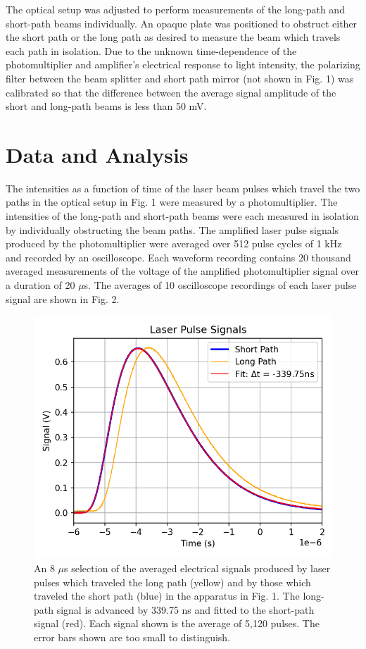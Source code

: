\documentclass[%
 reprint,
 amsmath,amssymb,
 aps,
]{revtex4-2}
\begin{document}
The optical setup was adjusted to perform measurements of the long-path and short-path beams individually. An opaque plate was positioned to obstruct either the short path or the long path as desired to measure the beam which travels each path in isolation. Due to the unknown time-dependence of the photomultiplier and amplifier's electrical response to light intensity, the polarizing filter between the beam splitter and short path mirror (not shown in Fig. 1) was calibrated so that the difference between the average signal amplitude of the short and long-path beams is less than 50 mV.

\section{Data and Analysis}

The intensities as a function of time of the laser beam pulses which travel the two paths in the optical setup in Fig. 1 were measured by a photomultiplier. The intensities of the long-path and short-path beams were each measured in isolation by individually obstructing the beam paths. The amplified laser pulse signals produced by the photomultiplier were averaged over 512 pulse cycles of 1 kHz and recorded by an oscilloscope. Each waveform recording contains 20 thousand averaged measurements of the voltage of the amplified photomultiplier signal over a duration of 20 $\mu$s. The averages of 10 oscilloscope recordings of each laser pulse signal are shown in Fig. 2. 

\begin{figure}[H]
\centering
\includegraphics[width=0.9\columnwidth]{Signals2.png}%
\caption{\label{fig:epsart} An 8 $\mu$s selection of the averaged electrical signals produced by laser pulses which traveled the long path (yellow) and by those which traveled the short path (blue) in the apparatus in Fig. 1. The long-path signal is advanced by 339.75 ns and fitted to the short-path signal (red). Each signal shown is the average of 5,120 pulses. The error bars shown are too small to distinguish. }
\end{figure}
\end{document}

